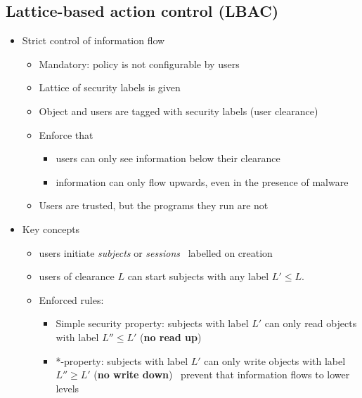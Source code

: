 \documentclass[12pt,titlepage,a4paper]{report}
\begin{document}
			\subsection{Lattice-based action control (LBAC)}
			\begin{itemize}
				\item Strict control of information flow
				\begin{itemize}
					\item Mandatory: policy is not configurable by users
					\item Lattice of security labels is given
					\item Object and users are tagged with security labels (user clearance)
					\item Enforce that
					\begin{itemize}
						\item users can only see information below their clearance
						\item information can only flow upwards, even in the presence of malware
					\end{itemize}
					\item Users are trusted, but the programs they run are not
				\end{itemize}
				\item Key concepts
				\begin{itemize}
					\item users initiate \textit{subjects} or \textit{sessions} \textrightarrow \, labelled on creation
					\item users of clearance $L$ can start subjects with any label $L' \leq L$.
					\item Enforced rules:
					\begin{itemize}
						\item Simple security property: subjects with label $L'$ can only read objects with label $L'' \leq L'$ (\textbf{no read up})
						\item *-property: subjects with label $L'$ can only write objects with label $L'' \geq L'$ (\textbf{no write down}) \textrightarrow \, prevent that information flows to lower levels
					\end{itemize}
				\end{itemize}
			\end{itemize}
\end{document}
